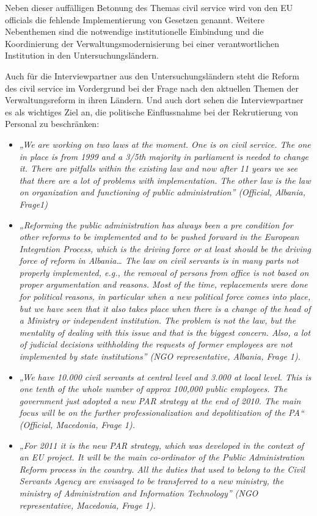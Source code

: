 Neben dieser auffälligen Betonung des Themas civil service wird von den EU officials die fehlende Implementierung von Gesetzen genannt. Weitere Nebenthemen sind die notwendige institutionelle Einbindung und die Koordinierung der Verwaltungsmodernisierung bei einer verantwortlichen Institution in den Untersuchungsländern.\par
Auch für die Interviewpartner aus den Untersuchungsländern steht die Reform des civil service im Vordergrund bei der Frage nach den aktuellen Themen der Verwaltungsreform in ihren Ländern. Und auch dort sehen die Interviewpartner es als wichtiges Ziel an, die politische Einflussnahme bei der Rekrutierung von Personal zu beschränken:
\begin{itemize}[label={}]
\item \textit{„We are working on two laws at the moment. One is on civil service. The one in place is from 1999 and a 3/5th majority in parliament is needed to change it. There are pitfalls within the existing law and now after 11 years we see that there are a lot of problems with implementation. The other law is the law on organization and functioning of public administration” (Official, Albania, Frage1)}
\item \textit{„Reforming the public administration has always been a pre condition for other reforms to be implemented and to be pushed forward in the European Integration Process, which is the driving force or at least should be the driving force of reform in Albania… The law on civil servants is in many parts not properly implemented, e.g., the removal of persons from office is not based on proper argumentation and reasons. Most of the time, replacements were done for political reasons, in particular when a new political force comes into place, but we have seen that it also takes place when there is a change of the head of a Ministry or independent institution. The problem is not the law, but the mentality of dealing with this issue and that is the biggest concern. Also, a lot of judicial decisions withholding the requests of former employees are not implemented by state institutions” (NGO representative, Albania, Frage 1).}
\item \textit{„We have 10.000 civil servants at central level and 3.000 at local level. This is one tenth of the whole number of approx 100,000 public employees. The government just adopted a new PAR strategy at the end of 2010. The main focus will be on the further professionalization and depolitization of the PA“ (Official, Macedonia, Frage 1).}
\item \textit{„For 2011 it is the new PAR strategy, which was developed in the context of an EU project. It will be the main co-ordinator of the Public Administration Reform process in the country. All the duties that used to belong to the Civil Servants Agency are envisaged to be transferred to a new ministry, the ministry of Administration and Information Technology” (NGO representative, Macedonia, Frage 1).}

\end{itemize}
